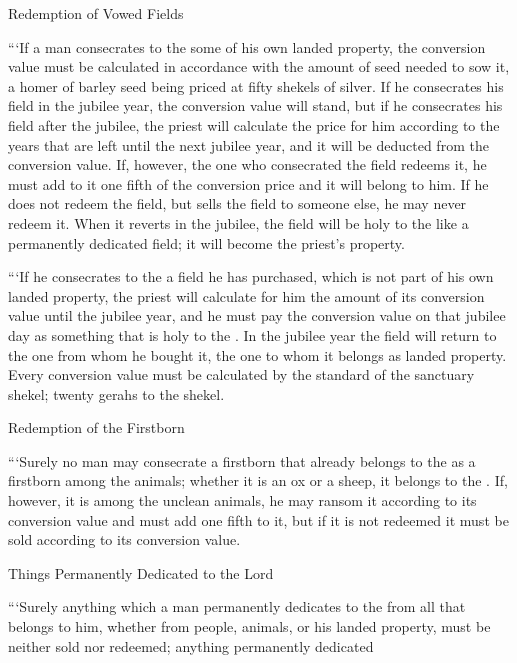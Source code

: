 {\par }{\SH Redemption of Vowed Fields
\par }{\PP {}“‘If
a man
consecrates
to the
{}
some of his own landed
property,
the conversion value
must be calculated in accordance
with the amount of seed
needed to sow it, a homer
of barley
seed
being priced at fifty
shekels
of silver.
If
he consecrates
his field
in the jubilee
year,
the conversion value
will stand,
but if
he consecrates
his field
after
the jubilee,
the priest
will calculate
the price
for him
according
to the years
that are left
until
the next jubilee
year,
and it will be deducted
from the conversion value.
If,
however, the one who consecrated
the field
redeems
it, he must add
to it one fifth
of the conversion price
and it will belong to him.
If
he does not
redeem
the field,
but
sells
the field
to someone
else,
he may never
redeem it.
When
it reverts
in the jubilee,
the field
will be holy
to the
{}
like a permanently dedicated
field;
it will become
the priest’s
property.
\par }{\PP {}“‘If
he consecrates
to the
{}
a field
he has purchased,
which
is not
part of his own landed
property,
the
priest
will calculate
for him the amount
of its conversion value
until
the jubilee
year,
and he must pay
the
conversion value
on that jubilee day
as something that
is holy
to the
{}.
In the jubilee
year
the field
will return
to the one from whom
he bought
it, the one to whom
it belongs as landed
property.
Every
conversion value
must be calculated by the standard of the sanctuary
shekel;
twenty
gerahs
to the shekel.
\par }{\SH Redemption of the Firstborn
\par }{\PP {}“‘Surely
no
man
may consecrate
a firstborn
that already belongs to the
{}
as
a firstborn
among the animals;
whether
it is an ox
or
a sheep,
it belongs to the
{}.
If,
however, it is among the unclean
animals,
he may ransom
it according to its conversion value
and must add
one fifth
to
it, but if
it is not
redeemed
it must be sold
according to its conversion value.
\par }{\SH Things Permanently Dedicated to the Lord
\par }{\PP {}“‘Surely
anything
which
a man
permanently dedicates
to the
{}
from all
that belongs
to him, whether from people,
animals,
or his landed
property,
must be neither sold
nor
redeemed;
anything
permanently dedicated
}
